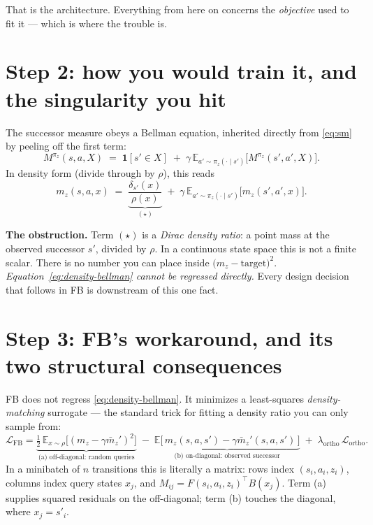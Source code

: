 \documentclass[11pt]{article}
\newcommand{\E}{\mathbb{E}}
\newcommand{\ind}[1]{\mathbf{1}\!\left[#1\right]}
\begin{document}
That is the architecture. Everything from here on concerns the \emph{objective}
used to fit it --- which is where the trouble is.

\section{Step 2: how you would train it, and the singularity you hit}
\label{sec:singularity}

The successor measure obeys a Bellman equation, inherited directly from
\eqref{eq:sm} by peeling off the first term:
\[
M^{\pi_z}(s,a,X) \;=\; \ind{s'\in X} \;+\; \gamma\,\E_{a'\sim\pi_z(\cdot\mid s')}\big[M^{\pi_z}(s',a',X)\big].
\]
In density form (divide through by $\rho$), this reads
\begin{equation}
\label{eq:density-bellman}
m_z(s,a,x)
\;=\;
\underbrace{\frac{\delta_{s'}(x)}{\rho(x)}}_{\textstyle(\star)}
\;+\;
\gamma\,\E_{a'\sim\pi_z(\cdot\mid s')}\big[m_z(s',a',x)\big].
\end{equation}

\begin{keybox}
\textbf{The obstruction.} Term $(\star)$ is a \emph{Dirac density ratio}: a point
mass at the observed successor $s'$, divided by $\rho$. In a continuous state
space this is not a finite scalar. There is no number you can place inside
$\big(m_z - \text{target}\big)^2$. \emph{Equation~\eqref{eq:density-bellman}
cannot be regressed directly.} Every design decision that follows in FB is
downstream of this one fact.
\end{keybox}

\section{Step 3: FB's workaround, and its two structural consequences}

FB does not regress \eqref{eq:density-bellman}. It minimizes a least-squares
\emph{density-matching} surrogate --- the standard trick for fitting a density
ratio you can only sample from:
\begin{equation}
\label{eq:fb-loss}
\mathcal{L}_{\mathrm{FB}}
=
\underbrace{\tfrac12\,\E_{x\sim\rho}\big[(m_z - \gamma \bar m_z')^2\big]}_{\text{(a) off-diagonal: random queries}}
\;-\;
\underbrace{\E\big[\,m_z(s,a,s') - \gamma \bar m_z'(s,a,s')\,\big]}_{\text{(b) on-diagonal: observed successor}}
\;+\;
\lambda_{\mathrm{ortho}}\,\mathcal{L}_{\mathrm{ortho}} .
\end{equation}
In a minibatch of $n$ transitions this is literally a matrix: rows index
$(s_i,a_i,z_i)$, columns index query states $x_j$, and $M_{ij}=F(s_i,a_i,z_i)^\top
B(x_j)$. Term (a) supplies squared residuals on the off-diagonal; term (b) touches
the diagonal, where $x_j = s'_i$.
\end{document}

